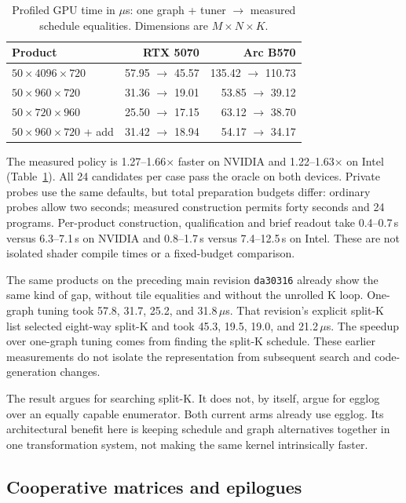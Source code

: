 \documentclass[10pt,twocolumn]{article}
\newcommand{\code}[1]{\texttt{#1}}
\begin{document}
\begin{table}[t]
\caption{Profiled GPU time in $\mu$s: one graph + tuner $\rightarrow$
measured schedule equalities. Dimensions are $M\times N\times K$.}
\label{tab:tile-study}
\centering
\small
\begin{tabular}{lrr}
\toprule
Product & RTX 5070 & Arc B570 \\
\midrule
$50\times4096\times720$ & 57.95 $\to$ 45.57 & 135.42 $\to$ 110.73 \\
$50\times960\times720$ & 31.36 $\to$ 19.01 & 53.85 $\to$ 39.12 \\
$50\times720\times960$ & 25.50 $\to$ 17.15 & 63.12 $\to$ 38.70 \\
$50\times960\times720$ + add & 31.42 $\to$ 18.94 & 54.17 $\to$ 34.17 \\
\bottomrule
\end{tabular}
\end{table}

The measured policy is 1.27--1.66$\times$ faster on NVIDIA and
1.22--1.63$\times$ on Intel (Table~\ref{tab:tile-study}). All 24 candidates
per case pass the oracle on both devices. Private probes use the same
defaults, but total preparation budgets differ: ordinary probes allow two
seconds; measured construction permits forty seconds and 24 programs.
Per-product construction, qualification and brief readout take 0.4--0.7\,s
versus 6.3--7.1\,s on NVIDIA and 0.8--1.7\,s versus 7.4--12.5\,s on Intel.
These are not isolated shader compile times or a fixed-budget comparison.

The same products on the preceding main revision \code{da30316} already
show the same kind of gap, without tile equalities and without the
unrolled K loop. One-graph tuning took 57.8, 31.7, 25.2, and
31.8\,$\mu$s. That revision's explicit split-K list selected eight-way
split-K and took 45.3, 19.5, 19.0, and 21.2\,$\mu$s. The speedup over
one-graph tuning comes from finding the split-K schedule. These earlier
measurements do not isolate the representation from subsequent search and
code-generation changes.

The result argues for searching split-K. It does not, by itself, argue
for egglog over an equally capable enumerator. Both current arms already
use egglog. Its architectural benefit here is keeping schedule and graph
alternatives together in one transformation system, not making the same
kernel intrinsically faster.

\subsection{Cooperative matrices and epilogues}
\end{document}

